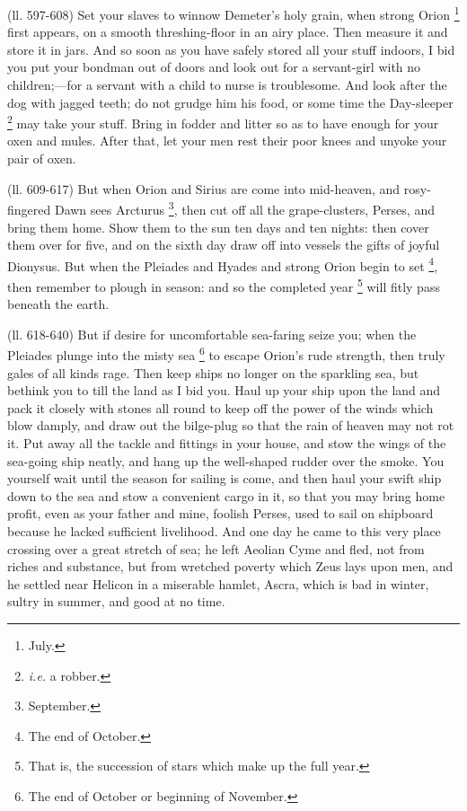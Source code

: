 (ll. 597-608) Set your slaves to winnow Demeter’s holy grain, when strong
Orion \footnote{July.} first appears, on a smooth
threshing-floor in an airy place. Then measure it and store it in jars. And so
soon as you have safely stored all your stuff indoors, I bid you put your
bondman out of doors and look out for a servant-girl with no
children;—for a servant with a child to nurse is troublesome. And look
after the dog with jagged teeth; do not grudge him his food, or some time the
Day-sleeper \footnote{\emph{i.e.} a robber.} may take your stuff. Bring in
fodder and litter so as to have enough for your oxen and mules. After that, let
your men rest their poor knees and unyoke your pair of oxen.

(ll. 609-617) But when Orion and Sirius are come into mid-heaven, and
rosy-fingered Dawn sees Arcturus \footnote{September.}, then cut
off all the grape-clusters, Perses, and bring them home. Show them to the sun
ten days and ten nights: then cover them over for five, and on the sixth day
draw off into vessels the gifts of joyful Dionysus. But when the Pleiades and
Hyades and strong Orion begin to set \footnote{The end of October.}, then
remember to plough in season: and so the completed year \footnote{That is, the succession of
stars which make up the full year.} will fitly pass beneath the
earth.

(ll. 618-640) But if desire for uncomfortable sea-faring seize you; when the
Pleiades plunge into the misty sea \footnote{The end of October or
beginning of November.} to escape
Orion’s rude strength, then truly gales of all kinds rage. Then keep
ships no longer on the sparkling sea, but bethink you to till the land as I bid
you. Haul up your ship upon the land and pack it closely with stones all round
to keep off the power of the winds which blow damply, and draw out the
bilge-plug so that the rain of heaven may not rot it. Put away all the tackle
and fittings in your house, and stow the wings of the sea-going ship neatly,
and hang up the well-shaped rudder over the smoke. You yourself wait until the
season for sailing is come, and then haul your swift ship down to the sea and
stow a convenient cargo in it, so that you may bring home profit, even as your
father and mine, foolish Perses, used to sail on shipboard because he lacked
sufficient livelihood. And one day he came to this very place crossing over a
great stretch of sea; he left Aeolian Cyme and fled, not from riches and
substance, but from wretched poverty which Zeus lays upon men, and he settled
near Helicon in a miserable hamlet, Ascra, which is bad in winter, sultry in
summer, and good at no time.

